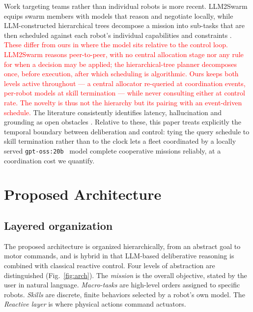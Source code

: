 \documentclass[conference]{IEEEtran}
\newif\ifrevmarks\revmarkstrue
\newcommand{\rev}[1]{\ifrevmarks\textcolor{red}{#1}\else#1\fi}
\begin{document}
Work targeting teams rather than individual robots is more recent.
LLM2Swarm \cite{strobel2024} equips swarm members with models that reason
and negotiate locally, while LLM-constructed hierarchical trees decompose
a mission into sub-tasks that are then scheduled against each robot's
individual capabilities and constraints \cite{gupta2025}.
\rev{These differ from ours in where the model sits relative to the
control loop. LLM2Swarm reasons peer-to-peer, with no central allocation
stage nor any rule for when a decision may be applied; the
hierarchical-tree planner decomposes once, before execution, after which
scheduling is algorithmic. Ours keeps both levels active throughout ---
a central allocator re-queried at coordination events, per-robot models
at skill termination --- while never consulting either at control rate.
The novelty is thus not the hierarchy but its pairing with an
event-driven schedule.}
The literature consistently identifies latency, hallucination and
grounding as open obstacles \cite{wang2023,nmi2025editorial}. Relative to
these, this paper treats explicitly the temporal boundary between
deliberation and control: tying the query schedule to skill termination
rather than to the clock lets a fleet coordinated by a locally served
\texttt{gpt-oss:20b}~\cite{gptoss} model complete cooperative missions
reliably, at a coordination cost we quantify.

\section{Proposed Architecture}

\subsection{Layered organization}

The proposed architecture is organized hierarchically, from an abstract
goal to motor commands, and is hybrid in that LLM-based deliberative
reasoning is combined with classical reactive control. Four levels of
abstraction are distinguished (Fig.~\ref{fig:arch}). 
The \emph{mission} is the overall objective, stated by the user in natural language. 
\emph{Macro-tasks} are high-level orders assigned to specific robots. 
\emph{Skills} are discrete, finite behaviors selected by a robot's own model.
The \emph{Reactive layer} is where physical actions command actuators.  
\end{document}
